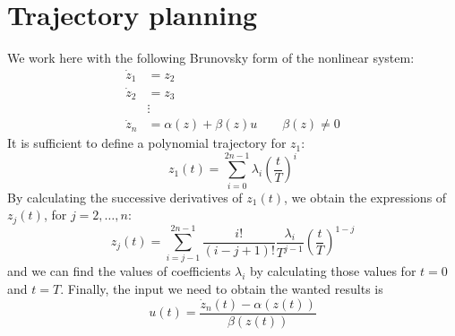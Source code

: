 \documentclass[12pt, openany]{report}
\theoremstyle{definition}
\begin{document}
\section{Trajectory planning}
We work here with the following Brunovsky form of the nonlinear system:
\begin{align}
    \dot z_1 &= z_2 \nonumber\\
    \dot z_2 &= z_3 \nonumber\\
    &\vdots \nonumber\\
    \dot z_n &= \alpha(z) + \beta(z)u \qquad \beta(z)\neq 0 
\end{align}
It is sufficient to define a polynomial trajectory for \(z_1\):
\begin{equation}
    z_1(t) = \sum_{i=0}^{2n-1}\lambda_i \left(\frac{t}{T}\right)^i
\end{equation}
By calculating the successive derivatives of \(z_1(t)\), we obtain the expressions of \(z_j(t)\), for \(j=2,\dots,n\):
\begin{equation}
    z_j(t) = \sum_{i=j-1}^{2n-1}\frac{i!}{(i-j+1)!}\frac{\lambda_i}{T^{j-1}}\left(\frac{t}{T}\right)^{1-j}
\end{equation}
and we can find the values of coefficients \(\lambda_i\) by calculating those values for \(t=0\) and \(t=T\). Finally, the input we need to obtain the wanted results is 
\begin{equation}
    u(t) = \frac{\dot z_n(t)-\alpha(z(t))}{\beta(z(t))}
\end{equation}
\end{document}
